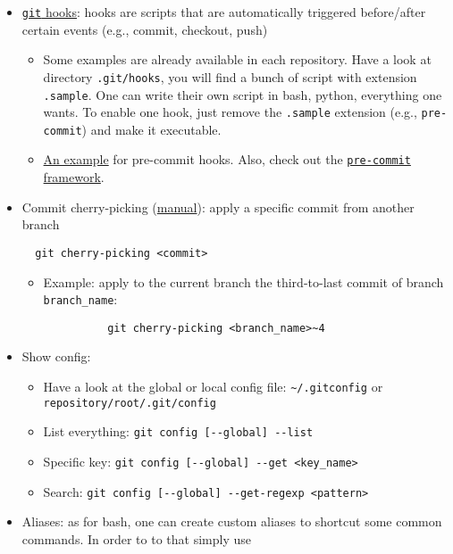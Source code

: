 \documentclass[a4paper,12pt,%
              final%
              ]{article}
\begin{document}
\begin{itemize}
  \item \href{https://git-scm.com/book/en/v2/Customizing-Git-Git-Hooks}{\texttt{git} hooks}: hooks are scripts that are automatically triggered before/after certain events (e.g., commit, checkout, push)
      \begin{itemize}
        \item Some examples are already available in each repository. Have a look at directory \texttt{.git/hooks}, you will find a bunch of script with extension \texttt{.sample}. One can write their own script in bash, python, everything one wants. To enable one hook, just remove the \texttt{.sample} extension (e.g., \texttt{pre-commit}) and make it executable.
        \item \href{https://verdantfox.com/blog/how-to-use-git-pre-commit-hooks-the-hard-way-and-the-easy-way}{An example} for pre-commit hooks. Also, check out the \href{https://github.com/pre-commit/pre-commit-hooks}{\texttt{pre-commit} framework}.
      \end{itemize}
  \item Commit cherry-picking (\href{https://git-scm.com/docs/git-cherry-pick}{manual}): apply a specific commit from another branch
\begin{verbatim}
  git cherry-picking <commit>
\end{verbatim}
    \begin{itemize}
      \item Example: apply to the current branch the third-to-last commit of branch \verb|branch_name|:
        \begin{verbatim}
          git cherry-picking <branch_name>~4
        \end{verbatim}
    \end{itemize}
  \item Show config:
    \begin{itemize}
      \item Have a look at the global or local config file: \verb|~/.gitconfig| or \verb|repository/root/.git/config|
      \item List everything: \verb|git config [--global] --list|
      \item Specific key: \verb|git config [--global] --get <key_name>|
      \item Search: \verb|git config [--global] --get-regexp <pattern>|
    \end{itemize}
  \item Aliases: as for bash, one can create custom aliases to shortcut some common commands. In order to to that simply use

\end{itemize}
\end{document}
